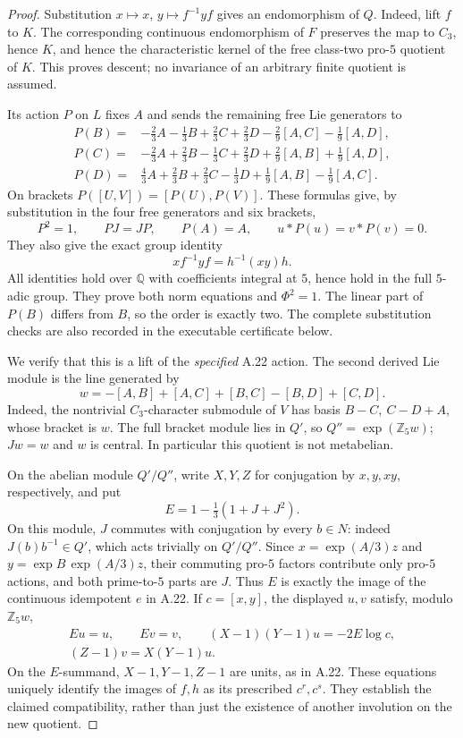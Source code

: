 \begin{proof}
Substitution $x\mapsto x$, $y\mapsto f^{-1}yf$ gives
an endomorphism of $Q$. Indeed, lift $f$ to $K$.
The corresponding continuous endomorphism of $F$
preserves the map to $C_3$, hence $K$, and hence the
characteristic kernel of the free class-two pro-$5$
quotient of $K$. This proves descent; no invariance of
an arbitrary finite quotient is assumed.

Its action $P$ on $L$ fixes $A$ and sends the remaining
free Lie generators to
\[
 \begin{aligned}
 P(B)={}&-\tfrac23A-\tfrac13B+\tfrac23C+\tfrac23D
              -\tfrac29[A,C]-\tfrac19[A,D],\\
 P(C)={}&-\tfrac23A+\tfrac23B-\tfrac13C+\tfrac23D
              +\tfrac29[A,B]+\tfrac19[A,D],\\
 P(D)={}& \tfrac43A+\tfrac23B+\tfrac23C-\tfrac13D
              +\tfrac19[A,B]-\tfrac19[A,C].
 \end{aligned}
\]
On brackets $P([U,V])=[P(U),P(V)]$.
These formulas give, by substitution in the four free
generators and six brackets,
\[
 P^2=1,\qquad PJ=JP,\qquad P(A)=A,\qquad
 u*P(u)=v*P(v)=0.
\]
They also give the exact group identity
\[
              x f^{-1}y f=h^{-1}(xy)h.
\]
All identities hold over $\mathbb Q$ with coefficients
integral at $5$, hence hold in the full $5$-adic group.
They prove both norm equations and $\Phi^2=1$.
The linear part of $P(B)$ differs from $B$, so the order
is exactly two. The complete substitution checks are
also recorded in the executable certificate below.

We verify that this is a lift of the \emph{specified}
A.22 action. The second derived Lie module is the line
generated by
\[
 w=-[A,B]+[A,C]+[B,C]-[B,D]+[C,D].
\]
Indeed, the nontrivial $C_3$-character submodule of $V$
has basis $B-C,\ C-D+A$, whose bracket is $w$.
The full bracket module lies in $Q'$, so
$Q''=\exp(\mathbb Z_5w)$; $Jw=w$ and $w$ is central.
In particular this quotient is not metabelian.

On the abelian module $Q'/Q''$, write $X,Y,Z$ for
conjugation by $x,y,xy$, respectively, and put
\[
 E=1-\tfrac13(1+J+J^2).
\]
On this module, $J$ commutes with conjugation by every
$b\in N$: indeed $J(b)b^{-1}\in Q'$, which acts
trivially on $Q'/Q''$. Since
$x=\exp(A/3)z$ and $y=\exp B\,\exp(A/3)z$,
their commuting pro-$5$ factors contribute only
pro-$5$ actions, and both prime-to-$5$ parts are
$J$. Thus $E$ is exactly the image of the continuous
idempotent $e$ in A.22.
If $c=[x,y]$, the displayed $u,v$ satisfy, modulo
$\mathbb Z_5w$,
\[
 \begin{gathered}
 Eu=u,\qquad Ev=v,\qquad
 (X-1)(Y-1)u=-2E\log c,\\
 (Z-1)v=X(Y-1)u.
 \end{gathered}
\]
On the $E$-summand, $X-1,Y-1,Z-1$ are units, as in
A.22. These equations uniquely identify the images of
$f,h$ as its prescribed $c^r,c^s$. They establish the
claimed compatibility, rather than just the existence
of another involution on the new quotient.


\end{proof}
